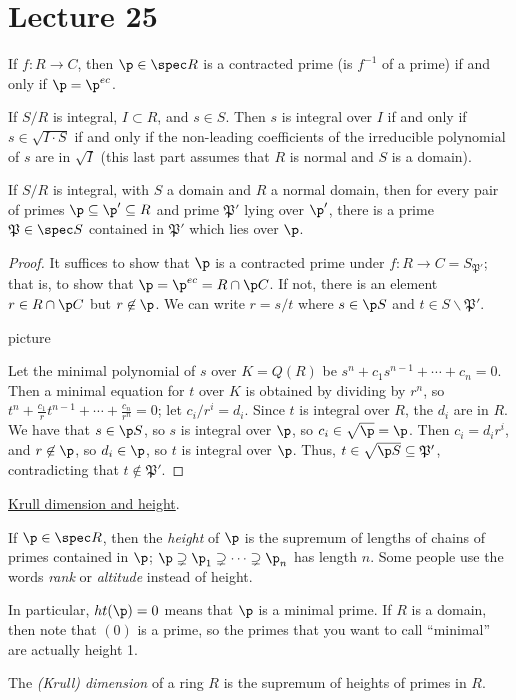  \section{Lecture 25}

 \begin{lemma}
   If $f:R\to C$, then $\p\in \spec R$ is a contracted prime (is $f^{-1}$ of a prime) if
   and only if $\p=\p^{ec}$.
 \end{lemma}
 \begin{lemma}
   If $S/R$ is integral, $I\subset R$, and $s\in S$. Then $s$ is integral over $I$ if and only
   if $s\in \sqrt{I\cdot S}$ if and only if the non-leading coefficients of the
   irreducible polynomial of $s$ are in $\sqrt I$ (this last part assumes that $R$ is
   normal and $S$ is a domain).
 \end{lemma}

 \begin{theorem}
   If $S/R$ is integral, with $S$ a domain and $R$ a normal domain, then for every pair
   of primes $\p\subseteq \p'\subseteq R$ and prime $\mathfrak{P}'$ lying over $\p'$,
   there is a prime $\mathfrak{P}\in \spec S$ contained in $\mathfrak{P}'$ which lies
   over $\p$.
 \end{theorem}
 \begin{proof}
   It suffices to show that $\p$ is a contracted prime under $f:R\to
   C=S_{\mathfrak{P}'}$; that is, to show that $\p=\p^{ec}=R\cap \p C$. If not, there is
   an element $r\in R\cap \p C$ but $r\not\in \p$. We can write $r= s/t$ where $s\in \p
   S$ and $t\in S\smallsetminus \mathfrak{P}'$.

   picture

   Let the minimal polynomial of $s$ over $K=Q(R)$ be $s^n+c_1s^{n-1}+\cdots + c_n=0$.
   Then a minimal equation for $t$ over $K$ is obtained by dividing by $r^n$, so
   $t^n+\frac{c_1}{r} t^{n-1} + \cdots + \frac{c_n}{r^n}=0$; let $c_i/r^i=d_i$. Since $t$
   is integral over $R$, the $d_i$ are in $R$. We have that $s\in \p S$, so $s$ is
   integral over $\p$, so $c_i\in \sqrt \p=\p$. Then $c_i=d_i r^i$, and $r\not\in \p$, so
   $d_i\in \p$, so $t$ is integral over $\p$. Thus, $t\in \sqrt {\p S}\subseteq
   \mathfrak{P}'$, contradicting that $t\not\in \mathfrak{P}'$.
 \end{proof}

 \underline{Krull dimension and height}.
 \begin{definition}
   If $\p\in \spec R$, then the \emph{height} of $\p$ is the supremum of lengths of
   chains of primes contained in $\p$; $\p\supsetneq \p_1\supsetneq \cdots\supsetneq
   \p_n$ has length $n$. Some people use the words \emph{rank} or \emph{altitude} instead
   of height.
 \end{definition}
 In particular, $ht(\p)=0$ means that $\p$ is a minimal prime. If $R$ is a domain, then
 note that $(0)$ is a prime, so the primes that you want to call ``minimal'' are actually
 height 1.
 \begin{definition}
   The \emph{(Krull) dimension} of a ring $R$ is the supremum of heights of primes in
   $R$.
 \end{definition}

